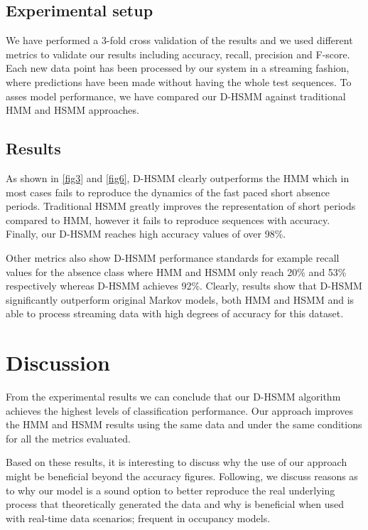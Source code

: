 \documentclass[conference]{IEEEtran}
\begin{document}
\subsection{Experimental setup}
We have performed a 3-fold cross validation of the results and we used different metrics to 
validate our results including accuracy, recall, precision and F-score. Each new data point has been processed by our system in a streaming fashion, where predictions have been made without having the whole test sequences. To asses model performance, we have compared our D-HSMM against traditional HMM and HSMM approaches. 

\subsection{Results}
As shown in \ref{fig3} and \ref{fig6}, D-HSMM clearly outperforms the HMM which in most cases fails to reproduce the dynamics of the fast paced short absence periods. Traditional HSMM greatly improves the representation of short periods compared to HMM, however it fails to reproduce sequences with accuracy. Finally, our D-HSMM reaches high accuracy values of over 98\%. 

Other metrics also show D-HSMM performance standards for example recall values for the absence class where HMM and HSMM only reach 20\% and 53\% respectively whereas D-HSMM achieves 92\%. Clearly, results show that D-HSMM significantly outperform original Markov models, both HMM and HSMM and is able to process streaming data with high degrees of accuracy for this dataset. 

 \section{Discussion}
 
 From the experimental results we can conclude that our D-HSMM algorithm achieves the highest levels of classification performance. Our approach improves the HMM and HSMM results using the same data and under the same conditions for all the metrics evaluated. 
 
 Based on these results, it is interesting to discuss why the use of our approach might be beneficial beyond the accuracy figures. Following, we discuss reasons as to why our model is a sound option to better reproduce the real underlying process that theoretically generated the data and why is beneficial when used with real-time data scenarios; frequent in occupancy models.
 
\end{document}
